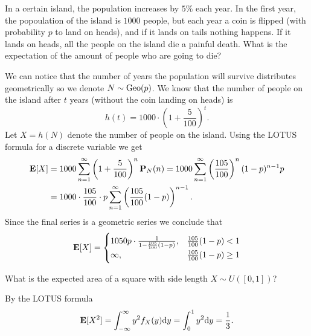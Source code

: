 \documentclass[11pt,a4paper]{article}
\begin{document}
\begin{exercise}
  In a certain island, the population increases by $5\%$ each year.
  In the first year, the popoulation of the island is $1000$ people,
  but each year a coin is flipped (with probability $p$ to land on heads),
  and if it lands on tails nothing happens. If it lands on heads, all
  the people on the island die a painful death. What is the expectation
  of the amount of people who are going to die?
\end{exercise}
\begin{solution}
  We can notice that the number of years the population will survive
  distributes geometrically so we denote $N \sim \operatorname{Geo}(p)$.
  We know that the number of people on the island
  after $t$ years (without the coin landing on heads) is
  \[
    h(t) = 1000 \cdot \left(1 + \frac{5}{100}\right)^t.
  \]
  Let $X = h(N)$ denote the number of people on the island.
  Using the LOTUS formula for a discrete variable we get
  \begin{align*}
    \mathbf{E}[X] &= 
    1000 \sum_{n=1}^{\infty} \left(1 + \frac{5}{100}\right)^n 
    \mathbf{P}_N(n) =
    1000 \sum_{n=1}^{\infty} \left(\frac{105}{100}\right)^n 
    (1 - p)^{n - 1} p \\ &=
    1000 \cdot \frac{105}{100} \cdot p 
    \sum_{n=1}^{\infty} \left(\frac{105}{100}(1-p)\right)^{n-1}.
  \end{align*}
  Since the final series is a geometric series
  we conclude that
  \[
    \mathbf{E}[X] =
    \begin{cases}
      1050 p \cdot \frac{1}{1 - \frac{105}{100}(1 - p)},
      &\frac{105}{100}(1-p) < 1 \\
      \infty,
      &\frac{105}{100}(1-p) \geq 1
    \end{cases}
  \]
\end{solution}

\begin{exercise}
  What is the expected area of a square with side length $X \sim U([0,1])$?
\end{exercise}
\begin{solution}
  By the LOTUS formula
  \[
    \E[X^{2}] =
    \int_{-\infty}^{\infty} y^{2} f_{X}(y) \dy =
    \int_{0}^{1} y^{2} \dy =
    \frac{1}{3}.
  \]
\end{solution}
\end{document}
